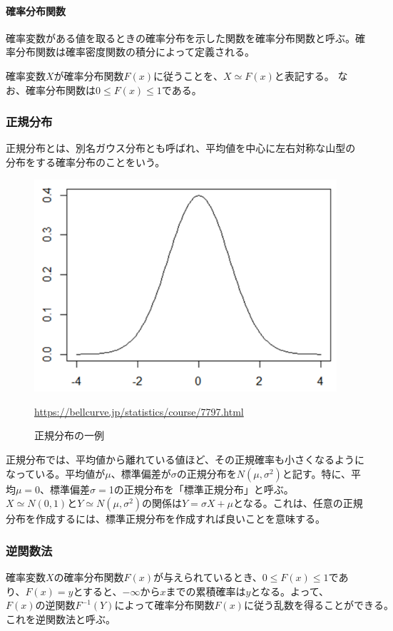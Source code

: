 \documentclass[dvipdfmx]{jsarticle}
\begin{document}
\paragraph{確率分布関数}確率変数がある値を取るときの確率分布を示した関数を確率分布関数と呼ぶ。確率分布関数は確率密度関数の積分によって定義される。\par
確率変数$X$が確率分布関数$F(x)$に従うことを、$X \simeq F(x)$と表記する。
なお、確率分布関数は$0 \leq F(x) \leq 1$である。
\subsubsection{正規分布}
正規分布とは、別名ガウス分布とも呼ばれ、平均値を中心に左右対称な山型の分布をする確率分布のことをいう。
\begin{figure}[H]
  \centering
  \includegraphics[scale=0.6]{795316b92fc766b0181f6fef074f03fa-8.png}
  \caption{正規分布の一例}
  \url{https://bellcurve.jp/statistics/course/7797.html}
\end{figure}
正規分布では、平均値から離れている値ほど、その正規確率も小さくなるようになっている。平均値が$\mu$、標準偏差が$\sigma$の正規分布を$N(\mu, \sigma^{2})$と記す。特に、平均$\mu = $0、標準偏差$\sigma = $1の正規分布を「標準正規分布」と呼ぶ。$X \simeq N(0, 1)とY \simeq N(\mu, \sigma^{2})の関係はY = \sigma X + \mu$となる。これは、任意の正規分布を作成するには、標準正規分布を作成すれば良いことを意味する。\par
\subsubsection{逆関数法}
確率変数$X$の確率分布関数$F(x)$が与えられているとき、$0 \leq F(x) \leq 1$であり、$F(x) = y$とすると、$-\infty からxまでの累積確率はy$となる。よって、$F(x)の逆関数F^{-1}(Y)によって確率分布関数F(x)に従う乱数を得ることができる。$これを逆関数法と呼ぶ。
\end{document}
